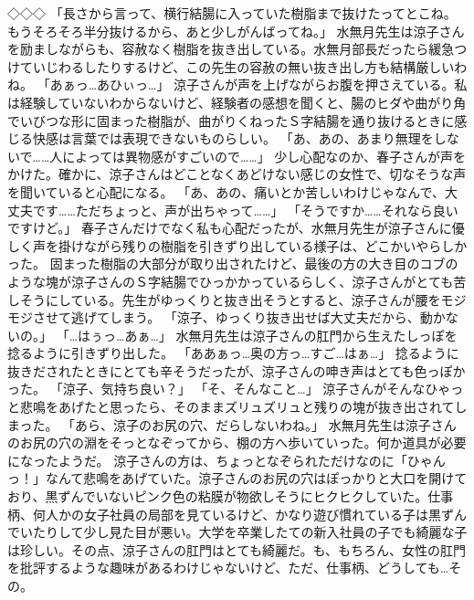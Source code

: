◇◇◇
「長さから言って、横行結腸に入っていた樹脂まで抜けたってとこね。もうそろそろ半分抜けるから、あと少しがんばってね。」
水無月先生は涼子さんを励ましながらも、容赦なく樹脂を抜き出している。水無月部長だったら緩急つけていじわるしたりするけど、この先生の容赦の無い抜き出し方も結構厳しいわね。
「あぁっ…あひぃっ…」
涼子さんが声を上げながらお腹を押さえている。私は経験していないわからないけど、経験者の感想を聞くと、腸のヒダや曲がり角でいびつな形に固まった樹脂が、曲がりくねったＳ字結腸を通り抜けるときに感じる快感は言葉では表現できないものらしい。
「あ、あの、あまり無理をしないで……人によっては異物感がすごいので……」
少し心配なのか、春子さんが声をかけた。確かに、涼子さんはどことなくあどけない感じの女性で、切なそうな声を聞いていると心配になる。
「あ、あの、痛いとか苦しいわけじゃなんで、大丈夫です……ただちょっと、声が出ちゃって……」
「そうですか……それなら良いですけど。」
春子さんだけでなく私も心配だったが、水無月先生が涼子さんに優しく声を掛けながら残りの樹脂を引きずり出している様子は、どこかいやらしかった。
固まった樹脂の大部分が取り出されたけど、最後の方の大き目のコブのような塊が涼子さんのＳ字結腸でひっかかっているらしく、涼子さんがとても苦しそうにしている。先生がゆっくりと抜き出そうとすると、涼子さんが腰をモジモジさせて逃げてしまう。
「涼子、ゆっくり抜き出せば大丈夫だから、動かないの。」
「…はぅっ…あぁ…」
水無月先生は涼子さんの肛門から生えたしっぽを捻るように引きずり出した。
「ああぁっ…奥の方っ…すご…はぁ…」
捻るように抜きだされたときにとても辛そうだったが、涼子さんの呻き声はとても色っぽかった。
「涼子、気持ち良い？」
「そ、そんなこと…」
涼子さんがそんなひゃっと悲鳴をあげたと思ったら、そのままズリュズリュと残りの塊が抜き出されてしまった。
「あら、涼子のお尻の穴、だらしないわね。」
水無月先生は涼子さんのお尻の穴の淵をそっとなぞってから、棚の方へ歩いていった。何か道具が必要になったようだ。
涼子さんの方は、ちょっとなぞられただけなのに「ひゃんっ！」なんて悲鳴をあげていた。涼子さんのお尻の穴はぽっかりと大口を開けており、黒ずんでいないピンク色の粘膜が物欲しそうにヒクヒクしていた。仕事柄、何人かの女子社員の局部を見ているけど、かなり遊び慣れている子は黒ずんでいたりして少し見た目が悪い。大学を卒業したての新入社員の子でも綺麗な子は珍しい。その点、涼子さんの肛門はとても綺麗だ。も、もちろん、女性の肛門を批評するような趣味があるわけじゃないけど、ただ、仕事柄、どうしても…その。

